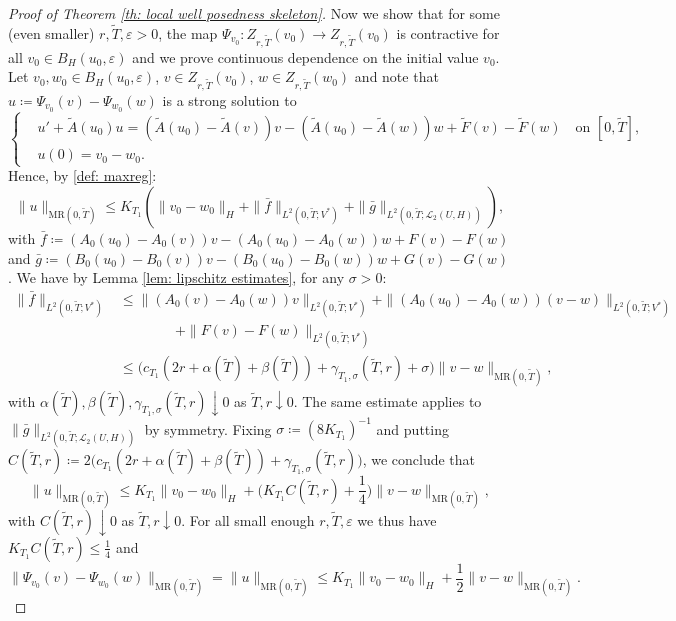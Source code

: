 \documentclass{amsart}
\renewcommand{\MR}{\mathrm{MR}}
\newcommand{\UH}{\mathcal{L}_2(U,H)}
\newcommand{\<}{\langle}
\newcommand{\?}{\rangle}
\theoremstyle{plain}
\theoremstyle{remark}
\theoremstyle{plain}
\numberwithin{equation}{section}
\newcommand{\eps}{\varepsilon}
\begin{document}
\begin{proof}[Proof of Theorem \ref{th: local well posedness skeleton}]
Now we show that for some (even smaller) $r,\tilde{T},\eps>0$, the map $\Psi_{v_0}\colon Z_{r,\tilde{T}}(v_0)\to Z_{r,\tilde{T}}(v_0)$ is contractive for all $v_0\in B_H(u_0,\eps)$ and we prove continuous dependence on the initial value $v_0$.
Let $v_0,w_0\in B_H(u_0,\eps)$, $v\in Z_{r,\tilde{T}}(v_0)$, $w\in Z_{r,\tilde{T}}(w_0)$ and note that $u\coloneqq \Psi_{v_0}(v)-\Psi_{w_0}(w)$ is a strong solution to
\begin{equation*}
  \begin{cases}
    &u'+\tilde{A}(u_0)u=(\tilde{A}(u_0)-\tilde{A}(v))v-(\tilde{A}(u_0)-\tilde{A}(w))w+\tilde{F}(v)-\tilde{F}(w)\quad \text{on } [0,\tilde{T}],\\
    &u(0)=v_0-w_0.
  \end{cases}
\end{equation*}
Hence, by \eqref{def: maxreg}:
\[
\|u\|_{\MR(0,\tilde{T})}\leq  K_{T_1}(\|v_0-w_0\|_H+\|\bar{f}\|_{L^2(0,\tilde{T};V^*)}+\|\bar{g}\|_{L^2(0,\tilde{T};\UH)}),
\]
with $\bar{f}\coloneqq (A_0(u_0)-A_0(v))v-(A_0(u_0)-A_0(w))w + F(v)-F(w)$ and $\bar{g}\coloneqq (B_0(u_0)-B_0(v))v-(B_0(u_0)-B_0(w))w + G(v)-G(w)$. We have by Lemma \ref{lem: lipschitz estimates}, for any $\sigma>0$: 
\begin{align*}
\|\bar{f}\|_{L^2(0,\tilde{T};V^*)}&\leq \|(A_0(v)-A_0(w))v\|_{L^2(0,\tilde{T};V^*)} +\|(A_0(u_0)-A_0(w))(v-w)\|_{L^2(0,\tilde{T};V^*)}\\
&\qquad\qquad+\|F(v)-F(w)\|_{L^2(0,\tilde{T};V^*)}\\
&\leq \Big(c_{T_1}(2r+\alpha(\tilde{T})+\beta(\tilde{T}))+\gamma_{T_1,\sigma}(\tilde{T},r)+\sigma\Big)\|v-w\|_{\MR(0,\tilde{T})},
\end{align*}
with $\alpha(\tilde{T}), \beta(\tilde{T}),\gamma_{T_1,\sigma}(\tilde{T},r)\downarrow 0$ as $\tilde{T},r\downarrow 0$. The same estimate applies to $\|\bar{g}\|_{L^2(0,\tilde{T};\UH)}$ by symmetry. Fixing $\sigma\coloneqq (8K_{T_1})^{-1}$ and putting $C(\tilde{T},r)\coloneqq 2\big(c_{T_1}(2r+\alpha(\tilde{T})+\beta(\tilde{T}))+\gamma_{T_1,\sigma}(\tilde{T},r)\big)$, we conclude that
\[
\|u\|_{\MR(0,\tilde{T})}\leq K_{T_1}\|v_0-w_0\|_H+\big(K_{T_1}C(\tilde{T},r)+\frac{1}{4}\big)\|v-w\|_{\MR(0,\tilde{T})},
\]
with $C(\tilde{T},r)\downarrow0$ as $\tilde{T},r\downarrow0$.
For all small enough $r,\tilde{T},\eps$ we thus have $K_{T_1}C(\tilde{T},r)\leq \frac{1}{4}$ and
\begin{equation}\label{eq: Psi contraction}
\|\Psi_{v_0}(v)-\Psi_{w_0}(w)\|_{\MR(0,\tilde{T})}=\|u\|_{\MR(0,\tilde{T})}\leq K_{T_1}\|v_0-w_0\|_H+\frac{1}{2}\|v-w\|_{\MR(0,\tilde{T})}.

\end{equation}
\end{proof}
\end{document}
